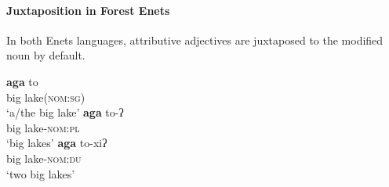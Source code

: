 \paragraph*{Juxtaposition in Forest Enets}
In both Enets languages, attributive adjectives are juxtaposed to the modified noun by default.
\begin{exe}
\label{enets juxt}
\begin{xlist}
\ex 
\gll	\textbf{aga} to\\
	big lake(\textsc{nom:sg})\\
\glt	‘a/the big lake’
\ex 
\gll	\textbf{aga} to-ʔ\\
	big lake\textsc{-nom:pl}\\
\glt	‘big lakes’
\ex 
\gll	\textbf{aga} to-xiʔ\\
	big lake\textsc{-nom:du}\\
\glt	‘two big lakes’
\end{xlist}
\end{exe}

